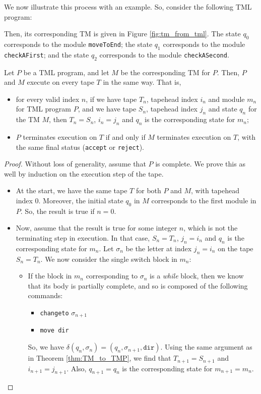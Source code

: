 \begin{appendices}
We now illustrate this process with an example. So, consider the following TML program:

Then, its corresponding TM is given in Figure \ref{fig:tm_from_tml}. The state $q_0$ corresponds to the module \texttt{moveToEnd}; the state $q_1$ corresponds to the module \texttt{checkAFirst}; and the state $q_2$ corresponds to the module \texttt{checkASecond}.

\begin{theorem}
    Let $P$ be a TML program, and let $M$ be the corresponding TM for $P$. Then, $P$ and $M$ execute on every tape $T$ in the same way. That is,
    \begin{itemize}
        \item for every valid index $n$, if we have tape $T_n$, tapehead index $i_n$ and module $m_n$ for TML program $P$, and we have tape $S_n$, tapehead index $j_n$ and state $q_n$ for the TM $M$, then $T_n = S_n$, $i_n = j_n$ and $q_n$ is the corresponding state for $m_n$;
        \item $P$ terminates execution on $T$ if and only if $M$ terminates execution on $T$, with the same final status (\texttt{accept} or \texttt{reject}).
    \end{itemize}
\end{theorem}
\begin{proof}
    Without loss of generality, assume that $P$ is complete. We prove this as well by induction on the execution step of the tape. 
    \begin{itemize}
        \item At the start, we have the same tape $T$ for both $P$ and $M$, with tapehead index $0$. Moreover, the initial state $q_0$ in $M$ corresponds to the first module in $P$. So, the result is true if $n = 0$. 
        
        \item Now, assume that the result is true for some integer $n$, which is not the terminating step in execution. In that case, $S_n = T_n$, $j_n = i_n$ and $q_n$ is the corresponding state for $m_n$. Let $\sigma_n$ be the letter at index $j_n = i_n$ on the tape $S_n = T_n$. We now consider the single switch block in $m_n$:
        \begin{itemize}
            \item If the block in $m_n$ corresponding to $\sigma_n$ is a \textit{while} block, then we know that its body is partially complete, and so is composed of the following commands:
            \begin{itemize}
                \item \texttt{changeto} $\sigma_{n+1}$
                \item \texttt{move dir}
            \end{itemize}
            So, we have $\delta(q_n, \sigma_n) = (q_n, \sigma_{n+1}, \texttt{dir})$. Using the same argument as in Theorem \ref{thm:TM_to_TMP}, we find that $T_{n+1} = S_{n+1}$ and $i_{n+1} = j_{n+1}$. Also, $q_{n+1} = q_n$ is the corresponding state for $m_{n+1} = m_n$. 
            

\end{itemize}
\end{itemize}
\end{proof}
\end{appendices}
